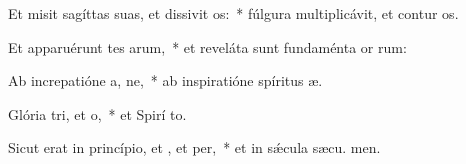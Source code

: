 \item Et misit sagíttas suas, et dissivit os:~* fúlgura multiplicávit, et contur os.
\item Et apparuérunt tes arum,~* et reveláta sunt fundaménta or rum:
\item Ab increpatióne a, ne,~* ab inspiratióne spíritus  æ.
\item Glória tri, et o,~* et Spirí to.
\item Sicut erat in princípio, et , et per,~* et in sǽcula sæcu. men.

